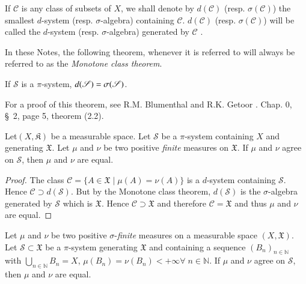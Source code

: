 If $\mathscr{C}$ is any class of subsets of $X$, we shall denote by
$d(\mathscr{C})$ (resp. $\sigma(\mathscr{C})$) the smallest $d$-system
(resp. $\sigma$-algebra) containing $\mathscr{C}$. $d(\mathscr{C})$
(resp. $\sigma(\mathscr{C})$) will be called the $d$-system
(resp. $\sigma$-algebra) generated by $\mathscr{C}$ . 

In these Notes, the following theorem, whenever it is referred to will
always be referred to as the {\em Monotone class theorem}. 

\begin{theorem*}
If $\mathscr{S}$ is a $\pi$-system, $d (\mathscr{S}) =\break
\sigma(\mathscr{S})$. 

For a proof of this theorem, see R.M. Blumenthal and R.K. Getoor
\cite{key1}. Chap. 0, \S\ 2, page 5, theorem (2.2). 
\end{theorem*}

\begin{proposition}\label{part1:chap3:prop23}
Let\pageoriginale $(X, \mathfrak{K})$ be a measurable space. Let
$\mathscr{S}$ be a $\pi$-system containing $X$ and generating
$\mathfrak{X}$. Let $\mu$ and $\nu$ be two positive {\em finite}
measures on $\mathfrak{X}$. If $\mu$ and $\nu$ agree on $\mathscr{S}$,
then $\mu$ and $\nu$ are equal. 
\end{proposition}

\begin{proof}
The class $\mathscr{C} = \{ A \in \mathfrak{X} \mid \mu (A) = \nu
(A)\}$ is a $d$-system containing $\mathscr{S}$. Hence $\mathscr{C}
\supset d (\mathscr{S})$. But by the Monotone class theorem,
$d(\mathscr{S})$ is the $\sigma$-algebra generated by $\mathscr{S}$
which is $\mathfrak{X}$. Hence $\mathscr{C} \supset \mathfrak{X}$ and
therefore $\mathscr{C} = \mathfrak{X}$ and thus $\mu$ and $\nu$ are
equal. 
\end{proof}

\begin{proposition}\label{part1:chap3:prop24}
Let $\mu$ and $\nu$ be two positive $\sigma$-{\em finite} measures on
a measurable space $(X, \mathfrak{X})$. Let $\mathscr{S} \subset
\mathfrak{X}$ be a $\pi$-system generating $\mathfrak{X}$ and
containing a sequence $(B_n)_{n \in \mathbb{N}}$ with
$\bigcup\limits_{n \in \mathbb{N}} B_n = X$, $\mu(B_n) = \nu (B_n) < +
\infty \forall \; n \in \mathbb{N}$. If $\mu$ and $\nu$ agree on
$\mathscr{S}$, then $\mu$ and $\nu$ are equal. 
\end{proposition}


